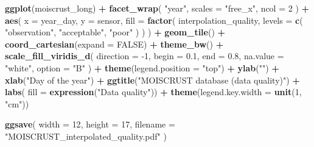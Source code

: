 \documentclass[]{article}
\newenvironment{Shaded}{\begin{snugshade}}{\end{snugshade}}
\newcommand{\DataTypeTok}[1]{\textcolor[rgb]{0.13,0.29,0.53}{#1}}
\newcommand{\DecValTok}[1]{\textcolor[rgb]{0.00,0.00,0.81}{#1}}
\newcommand{\FloatTok}[1]{\textcolor[rgb]{0.00,0.00,0.81}{#1}}
\newcommand{\KeywordTok}[1]{\textcolor[rgb]{0.13,0.29,0.53}{\textbf{#1}}}
\newcommand{\NormalTok}[1]{#1}
\newcommand{\OperatorTok}[1]{\textcolor[rgb]{0.81,0.36,0.00}{\textbf{#1}}}
\newcommand{\OtherTok}[1]{\textcolor[rgb]{0.56,0.35,0.01}{#1}}
\newcommand{\StringTok}[1]{\textcolor[rgb]{0.31,0.60,0.02}{#1}}
\begin{document}
\begin{Shaded}
\begin{Highlighting}[]
\KeywordTok{ggplot}\NormalTok{(moiscrust_long) }\OperatorTok{+}\StringTok{ }
\StringTok{  }\KeywordTok{facet_wrap}\NormalTok{(}
    \StringTok{"year"}\NormalTok{, }
    \DataTypeTok{scales =} \StringTok{"free_x"}\NormalTok{, }
    \DataTypeTok{ncol =} \DecValTok{2}
\NormalTok{    ) }\OperatorTok{+}
\StringTok{  }\KeywordTok{aes}\NormalTok{(}
    \DataTypeTok{x =}\NormalTok{ year_day, }
    \DataTypeTok{y =}\NormalTok{ sensor, }
    \DataTypeTok{fill =} \KeywordTok{factor}\NormalTok{(}
\NormalTok{      interpolation_quality, }
      \DataTypeTok{levels =} \KeywordTok{c}\NormalTok{(}
        \StringTok{"observation"}\NormalTok{, }
        \StringTok{"acceptable"}\NormalTok{, }
        \StringTok{"poor"}
\NormalTok{        )}
\NormalTok{      )}
\NormalTok{    ) }\OperatorTok{+}\StringTok{ }
\StringTok{  }\KeywordTok{geom_tile}\NormalTok{() }\OperatorTok{+}\StringTok{ }
\StringTok{  }\KeywordTok{coord_cartesian}\NormalTok{(}\DataTypeTok{expand =} \OtherTok{FALSE}\NormalTok{) }\OperatorTok{+}
\StringTok{  }\KeywordTok{theme_bw}\NormalTok{() }\OperatorTok{+}\StringTok{ }
\StringTok{  }\KeywordTok{scale_fill_viridis_d}\NormalTok{(}
    \DataTypeTok{direction =} \DecValTok{-1}\NormalTok{, }
    \DataTypeTok{begin =} \FloatTok{0.1}\NormalTok{,}
    \DataTypeTok{end =} \FloatTok{0.8}\NormalTok{, }
    \DataTypeTok{na.value =} \StringTok{"white"}\NormalTok{, }
    \DataTypeTok{option =} \StringTok{"B"}
\NormalTok{    ) }\OperatorTok{+}
\StringTok{  }\KeywordTok{theme}\NormalTok{(}\DataTypeTok{legend.position =} \StringTok{"top"}\NormalTok{) }\OperatorTok{+}\StringTok{ }
\StringTok{  }\KeywordTok{ylab}\NormalTok{(}\StringTok{""}\NormalTok{) }\OperatorTok{+}\StringTok{ }
\StringTok{  }\KeywordTok{xlab}\NormalTok{(}\StringTok{"Day of the year"}\NormalTok{) }\OperatorTok{+}
\StringTok{  }\KeywordTok{ggtitle}\NormalTok{(}\StringTok{"MOISCRUST database (data quality)"}\NormalTok{) }\OperatorTok{+}
\StringTok{  }\KeywordTok{labs}\NormalTok{(}
    \DataTypeTok{fill =} \KeywordTok{expression}\NormalTok{(}\StringTok{"Data quality"}\NormalTok{)) }\OperatorTok{+}\StringTok{ }
\StringTok{  }\KeywordTok{theme}\NormalTok{(}\DataTypeTok{legend.key.width =} \KeywordTok{unit}\NormalTok{(}\DecValTok{1}\NormalTok{, }\StringTok{"cm"}\NormalTok{))}

\KeywordTok{ggsave}\NormalTok{(}
  \DataTypeTok{width =} \DecValTok{12}\NormalTok{, }
  \DataTypeTok{height =} \DecValTok{17}\NormalTok{, }
  \DataTypeTok{filename =} \StringTok{"MOISCRUST_interpolated_quality.pdf"}
\NormalTok{  )}
\end{Highlighting}
\end{Shaded}
\end{document}
